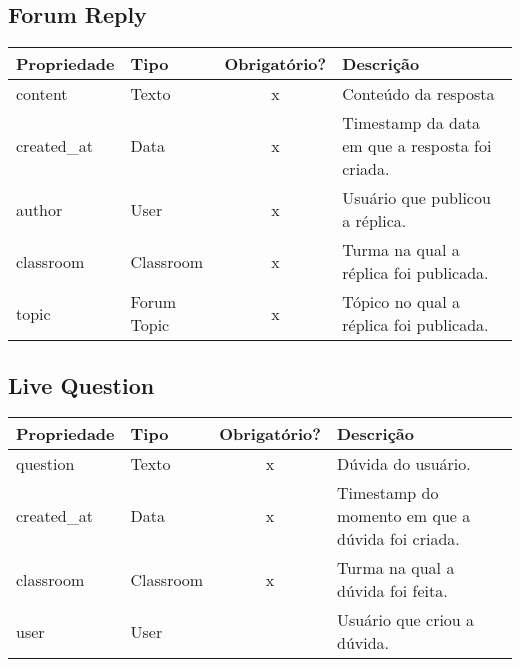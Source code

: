 \subsection{Forum Reply} \label{Forum Reply}
\begin{table}[H]
	\footnotesize
	\begin{tabularx}{\textwidth}{|X|X|c|p{7.8cm}|}   \hline \rowcolor[rgb]{0.8,0.8,0.8}
		
		\textbf{Propriedade} & \textbf{Tipo} & \textbf{Obrigatório?} & \centerline{\textbf{Descrição}} \\\hline  	
		
		content & Texto & x & Conteúdo da resposta \\\hline		
		created\_at & Data & x & Timestamp da data em que a resposta foi criada. \\\hline	
		author & User & x & Usuário que publicou a réplica. \\\hline
		classroom & Classroom & x & Turma na qual a réplica foi publicada. \\\hline
		topic & Forum Topic & x & Tópico no qual a réplica foi publicada. \\\hline
		
	\end{tabularx}	
\end{table}

\subsection{Live Question} \label{Live Question}
\begin{table}[H]
	\footnotesize
	\begin{tabularx}{\textwidth}{|X|X|c|p{7.8cm}|}   \hline \rowcolor[rgb]{0.8,0.8,0.8}
		
		\textbf{Propriedade} & \textbf{Tipo} & \textbf{Obrigatório?} & \centerline{\textbf{Descrição}} \\\hline  	
		
		question & Texto & x & Dúvida do usuário. \\\hline		
		created\_at & Data & x &  Timestamp do momento em que a dúvida foi criada. \\\hline		
		classroom & Classroom & x &  Turma na qual a dúvida foi feita. \\\hline		
		user & User & {} &  Usuário que criou a dúvida. \\\hline		
		
	\end{tabularx}	
\end{table}

